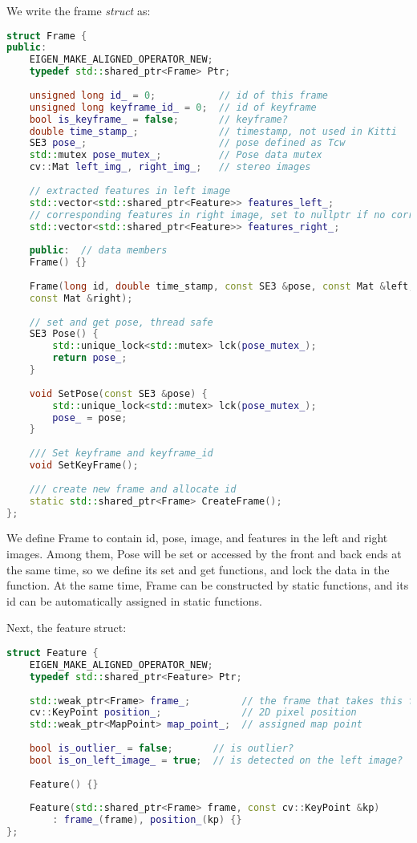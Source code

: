 We write the frame \textit{struct} as:
\begin{lstlisting}[language=c++,caption=slambook2/ch13/include/myslam/frame.h]
struct Frame {
public:
	EIGEN_MAKE_ALIGNED_OPERATOR_NEW;
	typedef std::shared_ptr<Frame> Ptr;
	
	unsigned long id_ = 0;           // id of this frame
	unsigned long keyframe_id_ = 0;  // id of keyframe
	bool is_keyframe_ = false;       // keyframe?
	double time_stamp_;              // timestamp, not used in Kitti
	SE3 pose_;                       // pose defined as Tcw
	std::mutex pose_mutex_;          // Pose data mutex
	cv::Mat left_img_, right_img_;   // stereo images
	
	// extracted features in left image
	std::vector<std::shared_ptr<Feature>> features_left_;
	// corresponding features in right image, set to nullptr if no corresponding
	std::vector<std::shared_ptr<Feature>> features_right_;
	
	public:  // data members
	Frame() {}
	
	Frame(long id, double time_stamp, const SE3 &pose, const Mat &left,
	const Mat &right);
	
	// set and get pose, thread safe
	SE3 Pose() {
		std::unique_lock<std::mutex> lck(pose_mutex_);
		return pose_;
	}
	
	void SetPose(const SE3 &pose) {
		std::unique_lock<std::mutex> lck(pose_mutex_);
		pose_ = pose;
	}
	
	/// Set keyframe and keyframe_id 
	void SetKeyFrame();
	
	/// create new frame and allocate id
	static std::shared_ptr<Frame> CreateFrame();
};
\end{lstlisting}

We define Frame to contain id, pose, image, and features in the left and right images. Among them, Pose will be set or accessed by the front and back ends at the same time, so we define its set and get functions, and lock the data in the function. At the same time, Frame can be constructed by static functions, and its id can be automatically assigned in static functions.

Next, the feature struct:
\begin{lstlisting}[language=c++,caption=slambook2/ch13/include/myslam/feature.h]
struct Feature {
	EIGEN_MAKE_ALIGNED_OPERATOR_NEW;
	typedef std::shared_ptr<Feature> Ptr;
	
	std::weak_ptr<Frame> frame_;         // the frame that takes this feature
	cv::KeyPoint position_;              // 2D pixel position
	std::weak_ptr<MapPoint> map_point_;  // assigned map point
	
	bool is_outlier_ = false;       // is outlier?
	bool is_on_left_image_ = true;  // is detected on the left image?
	
	Feature() {}
	
	Feature(std::shared_ptr<Frame> frame, const cv::KeyPoint &kp)
		: frame_(frame), position_(kp) {}
};
\end{lstlisting}

